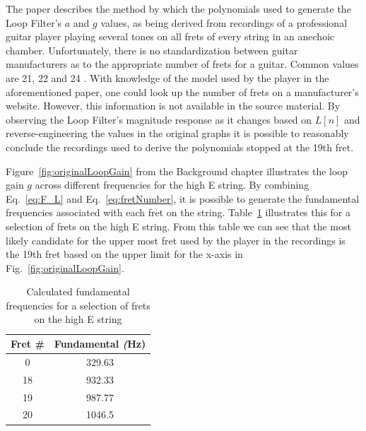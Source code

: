 \documentclass[../main.tex]{subfiles}
\begin{document}
The paper describes the method by which the polynomials used to generate the Loop Filter's $a$ and $g$ values, as being derived from recordings of a professional guitar player playing several tones on all frets of every string in an anechoic chamber. Unfortunately, there is no standardization between guitar manufacturers as to the appropriate number of frets for a guitar. Common values are 21, 22 and 24 . With knowledge of the model used by the player in the aforementioned paper, one could look up the number of frets on a manufacturer's website. However, this information is not available in the source material. By observing the Loop Filter's magnitude response as it changes based on $L[n]$ and reverse-engineering the values in the original graphs it is possible to reasonably conclude the recordings used to derive the polynomials stopped at the 19th fret.

Figure~\ref{fig:originalLoopGain} from the Background chapter illustrates the loop gain $g$ across different frequencies for the high E string. By combining Eq.~\ref{eq:F_L} and Eq.~\ref{eq:fretNumber}, it is possible to generate the fundamental frequencies associated with each fret on the string. Table~\ref{tab:eStringFrets} illustrates this for a selection of frets on the high E string. From this table we can see that the most likely candidate for the upper most fret used by the player in the recordings is the 19th fret based on the upper limit for the x-axis in Fig.~\ref{fig:originalLoopGain}.

\begin{table}[h]
\centering
\begin{tabular}{|c| c|} 
 \hline
 \textbf{Fret \#} & \textbf{Fundamental} \emph(Hz) \\ [0.5ex] 
 \hline
 0 & 329.63\\
 18 & 932.33\\
 19 & 987.77\\
 20 & 1046.5\\
 \hline
\end{tabular}
\caption{Calculated fundamental frequencies for a selection of frets on the high E string}
\label{tab:eStringFrets}
\end{table}
\end{document}
